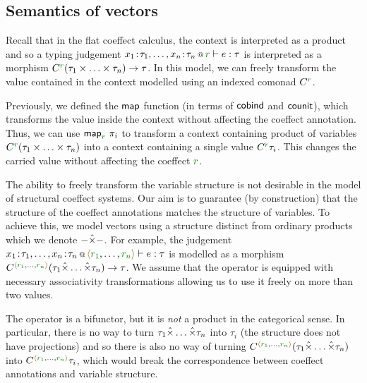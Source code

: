 
\subsection{Semantics of vectors}

Recall that in the flat coeffect calculus, the context is interpreted as a product and so a typing 
judgement $\coctx{x_1\!:\!\tau_1, \ldots, x_n\!:\!\tau_n}{\cclrd{r}} \vdash e : \tau$ is interpreted as a 
morphism $\ctyp{\cclrd{r}}{(\tau_1 \times \ldots \times \tau_n)} \rightarrow \tau$. In this model, 
we can freely transform the value contained in the context modelled using an indexed comonad
$\ctyp{\cclrd{r}}$. 

Previously, we defined the $\textnormal{\sffamily map}$ function (in terms of $\textnormal{\sffamily cobind}$ and $\textnormal{\sffamily counit}$),
which transforms the value inside the context without affecting the coeffect annotation. Thus,
we can use $\ident{map}_{\cclrd{r}}~\pi_i$ to transform a context containing product of variables
$\ctyp{\cclrd{r}}{(\tau_1 \times \ldots \times \tau_n)}$ into a context containing a single value 
$\ctyp{\cclrd{r}}{\tau_i}$. This changes the carried value without affecting the coeffect $\cclrd{r}$.

The ability to freely transform the variable structure is not desirable in the model of 
structural coeffect systems. Our aim is to guarantee (by construction) that the structure of
the coeffect annotations matches the structure of variables. To achieve this, we model vectors
using a structure distinct from ordinary products which we denote $-\hat{\times}-$. 
For example, the judgement $\coctx{x_1\!:\!\tau_1, \ldots, x_n\!:\!\tau_n}{\alift{\cclrd{r_1},\ldots,\cclrd{r_n}}} \vdash e : \tau$
is modelled as a morphism $\ctyp{\alift{\cclrd{r_1},\ldots,\cclrd{r_n}}}{(\tau_1 \xtimes \ldots \xtimes \tau_n)} \rightarrow \tau$.
We assume that the operator is equipped with necessary associativity transformations allowing us
to use it freely on more than two values.

The operator is a bifunctor, but it is \emph{not} a product in the categorical sense. In particular, 
there is no way to turn $\tau_1 \hat{\times} \ldots \hat{\times} \tau_n$ into $\tau_i$ (the structure does 
not have projections) and so there is also no way of turning
$\ctyp{\alift{\cclrd{r_1},\ldots,\cclrd{r_n}}}{(\tau_1 \xtimes \ldots \xtimes \tau_n)}$ into
$\ctyp{\alift{\cclrd{r_1},\ldots,\cclrd{r_n}}}{\tau_i}$, which would break the correspondence 
between coeffect annotations and variable structure.

